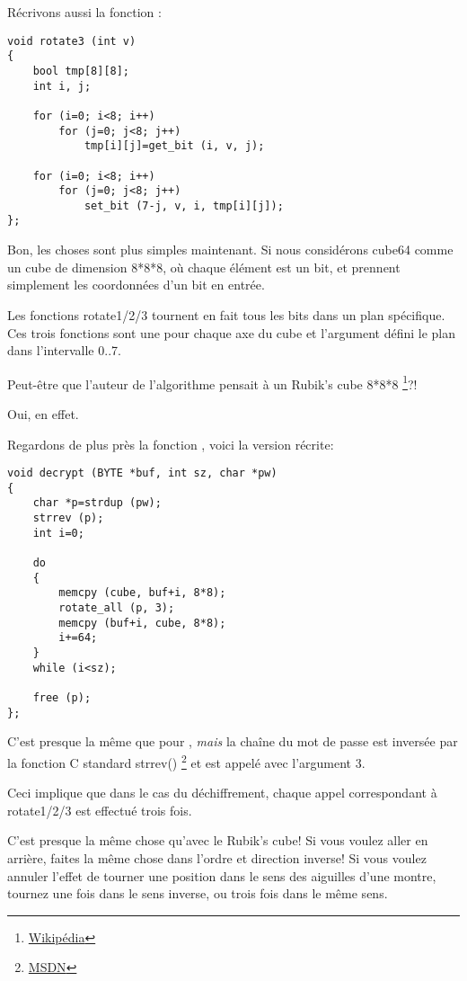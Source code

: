 Récrivons aussi la fonction :

\begin{lstlisting}[style=customc]
void rotate3 (int v)
{
	bool tmp[8][8];
	int i, j;

	for (i=0; i<8; i++)
		for (j=0; j<8; j++)
			tmp[i][j]=get_bit (i, v, j);

	for (i=0; i<8; i++)
		for (j=0; j<8; j++)
			set_bit (7-j, v, i, tmp[i][j]);
};
\end{lstlisting}

Bon, les choses sont plus simples maintenant. Si nous considérons cube64 comme un
cube de dimension 8*8*8, où chaque élément est un bit,  et 
prennent simplement les coordonnées d'un bit en entrée.

Les fonctions rotate1/2/3 tournent en fait tous les bits dans un plan spécifique.
Ces trois fonctions sont une pour chaque axe du cube et l'argument  défini
le plan dans l'intervalle 0..7.

Peut-être que l'auteur de l'algorithme pensait à un Rubik's cube 8*8*8
\footnote{\href{http://en.wikipedia.org/wiki/Rubik's_Cube}{Wikipédia}}?!

Oui, en effet.

Regardons de plus près la fonction , voici la version récrite:

\begin{lstlisting}[style=customc]
void decrypt (BYTE *buf, int sz, char *pw)
{
	char *p=strdup (pw);
	strrev (p);
	int i=0;

	do
	{
		memcpy (cube, buf+i, 8*8);
		rotate_all (p, 3);
		memcpy (buf+i, cube, 8*8);
		i+=64;
	}
	while (i<sz);
	
	free (p);
};
\end{lstlisting}

C'est presque la même que pour , \emph{mais} la chaîne du mot de passe
est inversée par la fonction C standard strrev() \footnote{\href{http://msdn.microsoft.com/en-us/library/9hby7w40(VS.80).aspx}{MSDN}}
et  est appelé avec l'argument 3.

Ceci implique que dans le cas du déchiffrement, chaque appel correspondant à rotate1/2/3
est effectué trois fois.

C'est presque la même chose qu'avec le Rubik's cube!
Si vous voulez aller en arrière, faites la même chose dans l'ordre et direction inverse!
Si vous voulez annuler l'effet de tourner une position dans le sens des aiguilles
d'une montre, tournez une fois dans le sens inverse, ou trois fois dans le même sens.

